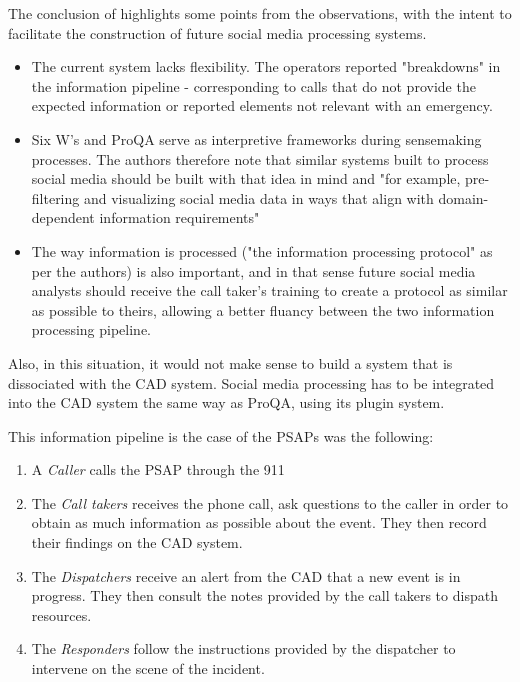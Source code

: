 The conclusion of \textcite{graceRolePlayingNext2019} highlights some points from the observations,
with the intent to facilitate the construction of future social media processing systems.
\begin{itemize}
    \item The current system lacks flexibility. The operators reported "breakdowns" in the
          information pipeline - corresponding to calls that do not provide the expected information
          or reported elements not relevant with an emergency.
    \item Six W's and ProQA serve as interpretive frameworks during sensemaking processes.
          The authors therefore note that similar systems built to process social media should
          be built with that idea in mind and "for example, pre-filtering and visualizing social
          media data in ways that align with domain-dependent information requirements"
    \item The way information is processed ("the information processing protocol" as per the authors)
          is also important, and in that sense future social media analysts should receive the
          call taker's training to create a protocol as similar as possible to theirs, allowing
          a better fluancy between the two information processing pipeline.
\end{itemize}
Also, in this situation, it would not make sense to build a system that is dissociated with the CAD system.
Social media processing has to be integrated into the CAD system the same way as ProQA, using its plugin system.

This information pipeline is the case of the PSAPs was the following:

\begin{enumerate}
    \item A \textit{Caller} calls the PSAP through the 911
    \item The \textit{Call takers} receives the phone call, ask questions to the caller in order to obtain as much information as possible about the event.
          They then record their findings on the CAD system.
    \item The \textit{Dispatchers} receive an alert from the CAD that a new event is in progress. They then consult the notes provided by the call takers to dispath resources.
    \item The \textit{Responders} follow the instructions provided by the dispatcher to intervene on the scene of the incident.
\end{enumerate}

